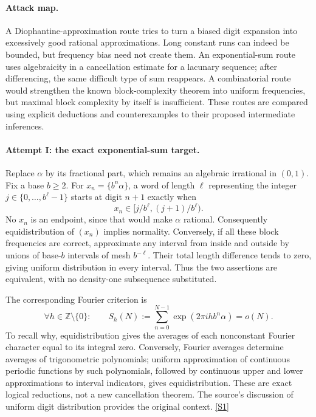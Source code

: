 \documentclass[11pt,a4paper]{article}
\newcommand{\Z}{\mathbb{Z}}
\newcommand{\sref}[2]{\hyperlink{source:#1:#2}{[S#2]}}
\numberwithin{equation}{section}
\begin{document}
\paragraph{Attack map.}
A Diophantine-approximation route tries to turn a biased digit expansion
into excessively good rational approximations.  Long constant runs
can indeed be bounded, but frequency bias need not create them.
An exponential-sum route uses algebraicity in a cancellation estimate
for a lacunary sequence; after differencing, the same difficult type
of sum reappears.  A combinatorial route would strengthen the known
block-complexity theorem into uniform frequencies, but maximal block
complexity by itself is insufficient.  These routes are compared using
explicit deductions and counterexamples to their proposed intermediate
inferences.

\paragraph{Attempt I: the exact exponential-sum target.}
Replace $\alpha$ by its fractional part, which remains an algebraic
irrational in $(0,1)$.  Fix a base $b\geq2$.  For
$x_n=\{b^n\alpha\}$, a word of length $\ell$ representing the integer
$j\in\{0,\ldots,b^\ell-1\}$ starts at digit $n+1$ exactly when
\[
 x_n\in[j/b^\ell,(j+1)/b^\ell).
\]
No $x_n$ is an endpoint, since that would make $\alpha$ rational.
Consequently equidistribution of $(x_n)$ implies normality.  Conversely,
if all these block frequencies are correct, approximate any interval
from inside and outside by unions of base-$b$ intervals of mesh
$b^{-\ell}$.  Their total length difference tends to zero, giving
uniform distribution in every interval.  Thus the two assertions are
equivalent, with no density-one subsequence substituted.

The corresponding Fourier criterion is
\begin{equation}\label{statement:weyl}
 \forall h\in\Z\setminus\{0\}:\qquad
 S_h(N):=\sum_{n=0}^{N-1}\exp(2\pi i h b^n\alpha)=o(N).
\end{equation}
To recall why, equidistribution gives the averages of each nonconstant
Fourier character equal to its integral zero.  Conversely, Fourier
averages determine averages of trigonometric polynomials; uniform
approximation of continuous periodic functions by such polynomials,
followed by continuous upper and lower approximations to interval
indicators, gives equidistribution.  These are exact logical
reductions, not a new cancellation theorem.  The source's discussion
of uniform digit distribution provides the original context.
\sref{statement}{1}
\end{document}
